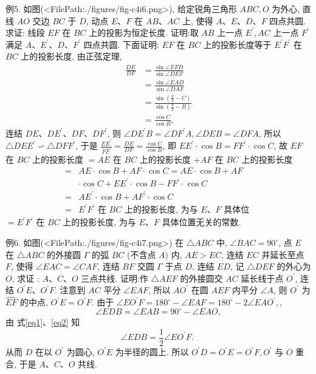 例5. 如图(<FilePath:./figures/fig-c4i6.png>), 给定锐角三角形 $A B C, O$ 为外心, 直线 $A O$ 交边 $B C$ 于 $D$, 动点 $E 、 F$ 在 $A B 、 A C$ 上, 使得 $A 、 E 、 D 、 F$ 四点共圆.
求证: 线段 $E F$ 在 $B C$ 上的投影为恒定长度.
证明:取 $A B$ 上一点 $E^{\prime}, A C$ 上一点 $F^{\prime}$ 满足 $A 、 E^{\prime} 、 D 、 F^{\prime}$ 四点共圆.
下面证明: $E F$ 在 $B C$ 上的投影长度等于 $E^{\prime} F^{\prime}$ 在 $B C$ 上的投影长度, 由正弦定理,
$$
\begin{aligned}
\frac{D E}{D F} & =\frac{\sin \angle E F D}{\sin \angle D E F} \\
& =\frac{\sin \angle E A D}{\sin \angle D A F} \\
& =\frac{\sin \left(\frac{\pi}{2}-C\right)}{\sin \left(\frac{\pi}{2}-B\right)} \\
& =\frac{\cos C}{\cos B},
\end{aligned}
$$
连结 $D E 、 D E^{\prime} 、 D F 、 D F^{\prime}$, 则 $\angle D E^{\prime} B=\angle D F^{\prime} A, \angle D E B=\angle D F A$, 所以 $\triangle D E E^{\prime} \backsim \triangle D F F^{\prime}$, 于是 $\frac{E E^{\prime}}{F F^{\prime}}=\frac{D E}{D F}=\frac{\cos C}{\cos B}$, 即 $E E^{\prime} \cdot \cos B=F F^{\prime} \cdot \cos C$, 故 $E F$ 在 $B C$ 上的投影长度 $=A E$ 在 $B C$ 上的投影长度 $+A F$ 在 $B C$ 上的投影长度
$$
\begin{aligned}
= & A E \cdot \cos B+A F \cdot \cos C=A E \cdot \cos B+A F \\
& \cdot \cos C+E E^{\prime} \cdot \cos B-F F^{\prime} \cdot \cos C \\
= & A E^{\prime} \cdot \cos B+A F^{\prime} \cdot \cos C \\
= & E^{\prime} F^{\prime} \text { 在 } B C \text { 上的投影长度, 为与 } E 、 F \text { 具体位 }
\end{aligned}
$$
$=E^{\prime} F^{\prime}$ 在 $B C$ 上的投影长度, 为与 $E 、 F$ 具体位置无关的常数.



例6. 如图(<FilePath:./figures/fig-c4i7.png>) 在 $\triangle A B C$ 中, $\angle B A C= 90^{\circ}$, 点 $E$ 在 $\triangle A B C$ 的外接圆 $\Gamma$ 的弧 $B C$ (不含点 $A)$ 内, $A E>E C$, 连结 $E C$ 并延长至点 $F$, 使得 $\angle E A C=\angle C A F$, 连结 $B F$ 交圆 $\Gamma$ 于点 $D$, 连结 $E D$, 记 $\triangle D E F$ 的外心为 $O$, 求证 : $A 、 C 、 O$ 三点共线.
证明:作 $\triangle A E F$ 的外接圆交 $A C$ 延长线于点 $O^{\prime}$, 连结 $O^{\prime} E 、 O^{\prime} F$. 注意到 $A C$ 平分 $\angle E A F$, 所以 $A O^{\prime}$ 在圆 $A E F$ 内平分 $\angle A$, 则 $O^{\prime}$ 为 $\overparen{E F}$ 的中点, $O^{\prime} E=O^{\prime} F$.
由于 $\angle E O^{\prime} F=180^{\circ}-\angle E A F=180^{\circ}-2 \angle E A O^{\prime}, \label{eq1}$,
$$
\angle E D B=\angle E A B=90^{\circ}-\angle E A O, \label{eq2}
$$
由 式\ref{eq1}、\ref{eq2} 知
$$
\angle E D B=\frac{1}{2} \angle E O^{\prime} F \text {. }
$$
从而 $D$ 在以 $O^{\prime}$ 为圆心, $O^{\prime} E$ 为半径的圆上.
所以 $O^{\prime} D=O^{\prime} E=O^{\prime} F, O^{\prime}$ 与 $O$ 重合, 于是 $A 、 C 、 O$ 共线.



